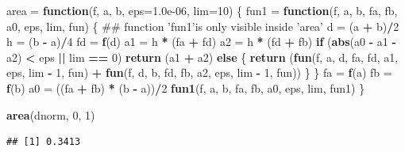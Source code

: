\documentclass[10pt,]{krantz}
\makeatletter
\newenvironment{Shaded}{\begin{snugshade}}{\end{snugshade}}
\newcommand{\KeywordTok}[1]{\textcolor[rgb]{0.13,0.29,0.53}{\textbf{#1}}}
\newcommand{\DataTypeTok}[1]{\textcolor[rgb]{0.13,0.29,0.53}{#1}}
\newcommand{\DecValTok}[1]{\textcolor[rgb]{0.00,0.00,0.81}{#1}}
\newcommand{\FloatTok}[1]{\textcolor[rgb]{0.00,0.00,0.81}{#1}}
\newcommand{\StringTok}[1]{\textcolor[rgb]{0.31,0.60,0.02}{#1}}
\newcommand{\ControlFlowTok}[1]{\textcolor[rgb]{0.13,0.29,0.53}{\textbf{#1}}}
\newcommand{\OperatorTok}[1]{\textcolor[rgb]{0.81,0.36,0.00}{\textbf{#1}}}
\newcommand{\NormalTok}[1]{#1}
\newenvironment{kframe}{%
\medskip{}
\setlength{\fboxsep}{.8em}
 \def\at@end@of@kframe{}%
 \ifinner\ifhmode%
  \def\at@end@of@kframe{\end{minipage}}%
  \begin{minipage}{\columnwidth}%
 \fi\fi%
 \def\FrameCommand##1{\hskip\@totalleftmargin \hskip-\fboxsep
 \colorbox{shadecolor}{##1}\hskip-\fboxsep
     \hskip-\linewidth \hskip-\@totalleftmargin \hskip\columnwidth}%
 \MakeFramed {\advance\hsize-\width
   \@totalleftmargin\z@ \linewidth\hsize
   \@setminipage}}%
 {\par\unskip\endMakeFramed%
 \at@end@of@kframe}
\renewenvironment{Shaded}{\begin{kframe}}{\end{kframe}}
\makeatother
\begin{document}
\begin{Shaded}
\begin{Highlighting}[]
\NormalTok{area =}\StringTok{ }\ControlFlowTok{function}\NormalTok{(f, a, b, }\DataTypeTok{eps=}\FloatTok{1.0e-06}\NormalTok{, }\DataTypeTok{lim=}\DecValTok{10}\NormalTok{) }
\NormalTok{\{}
\NormalTok{  fun1 =}\StringTok{ }\ControlFlowTok{function}\NormalTok{(f, a, b, fa, fb, a0, eps, lim, fun) }
\NormalTok{  \{}
\NormalTok{  ## function 'fun1’is only visible inside 'area’}
\NormalTok{    d =}\StringTok{ }\NormalTok{(a }\OperatorTok{+}\StringTok{ }\NormalTok{b)}\OperatorTok{/}\DecValTok{2}
\NormalTok{    h =}\StringTok{ }\NormalTok{(b }\OperatorTok{-}\StringTok{ }\NormalTok{a)}\OperatorTok{/}\DecValTok{4}
\NormalTok{    fd =}\StringTok{ }\KeywordTok{f}\NormalTok{(d)}
\NormalTok{    a1 =}\StringTok{ }\NormalTok{h }\OperatorTok{*}\StringTok{ }\NormalTok{(fa }\OperatorTok{+}\StringTok{ }\NormalTok{fd)}
\NormalTok{    a2 =}\StringTok{ }\NormalTok{h }\OperatorTok{*}\StringTok{ }\NormalTok{(fd }\OperatorTok{+}\StringTok{ }\NormalTok{fb)}
    \ControlFlowTok{if}\NormalTok{ (}\KeywordTok{abs}\NormalTok{(a0 }\OperatorTok{-}\StringTok{ }\NormalTok{a1 }\OperatorTok{-}\StringTok{ }\NormalTok{a2) }\OperatorTok{<}\StringTok{ }\NormalTok{eps }\OperatorTok{||}\StringTok{ }\NormalTok{lim }\OperatorTok{==}\StringTok{ }\DecValTok{0}\NormalTok{)}
      \KeywordTok{return}\NormalTok{ (a1 }\OperatorTok{+}\StringTok{ }\NormalTok{a2)}
    \ControlFlowTok{else}\NormalTok{ \{}
      \KeywordTok{return}\NormalTok{ (}\KeywordTok{fun}\NormalTok{(f, a, d, fa, fd, a1, eps, lim }\OperatorTok{-}\StringTok{ }\DecValTok{1}\NormalTok{, fun) }\OperatorTok{+}\StringTok{ }\KeywordTok{fun}\NormalTok{(f, d, b, fd, fb, a2, eps, lim }\OperatorTok{-}\StringTok{ }\DecValTok{1}\NormalTok{, fun))}
\NormalTok{    \}}
\NormalTok{  \}}
\NormalTok{  fa =}\StringTok{ }\KeywordTok{f}\NormalTok{(a)}
\NormalTok{  fb =}\StringTok{ }\KeywordTok{f}\NormalTok{(b)}
\NormalTok{  a0 =}\StringTok{ }\NormalTok{((fa }\OperatorTok{+}\StringTok{ }\NormalTok{fb) }\OperatorTok{*}\StringTok{ }\NormalTok{(b }\OperatorTok{-}\StringTok{ }\NormalTok{a))}\OperatorTok{/}\DecValTok{2}
  \KeywordTok{fun1}\NormalTok{(f, a, b, fa, fb, a0, eps, lim, fun1)}
\NormalTok{\} }

\KeywordTok{area}\NormalTok{(dnorm, }\DecValTok{0}\NormalTok{, }\DecValTok{1}\NormalTok{)}
\end{Highlighting}
\end{Shaded}

\begin{verbatim}
## [1] 0.3413
\end{verbatim}
\end{document}

